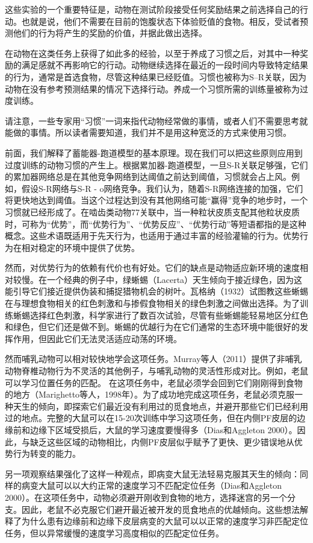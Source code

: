 这些实验的一个重要特征是，动物在测试阶段接受任何奖励结果之前选择自己的行动。也就是说，他们不需要在目前的饱腹状态下体验贬值的食物。相反，受试者预测他们的行为将产生的奖励的价值，并据此做出选择。\par
在动物在这类任务上获得了如此多的经验，以至于养成了习惯之后，对其中一种奖励的满足感就不再影响它的行动。动物继续选择在最近的一段时间内导致特定结果的行为，通常是首选食物，尽管这种结果已经贬值。习惯也被称为S–R关联，因为动物在没有参考预测结果的情况下选择行动。养成一个习惯所需的训练量被称为过度训练。\par
请注意，一些专家用“习惯”一词来指代动物经常做的事情，或者人们不需要思考就能做的事情。所以读者需要知道，我们并不是用这种宽泛的方式来使用习惯。\par
前面，我们解释了蓄能器-跑道模型的基本原理。现在我们可以把这些原则应用到过度训练的动物习惯的产生上。根据累加器-跑道模型，一旦S-R关联足够强，它们的累加器网络总是在其他竞争网络到达阈值之前达到阈值，习惯就会占上风。例如，假设S-R网络与S-R - o网络竞争。我们认为，随着S-R网络连接的加强，它们将更快地达到阈值。当这个过程达到没有其他网络可能“赢得”竞争的地步时，一个习惯就已经形成了。在啮齿类动物77关联中，当一种粒状皮质支配其他粒状皮质时，可称为“优势”，而“优势行为”、“优势反应”、“优势行动”等短语都指的是这种概念。这些术语既适用于先天行为，也适用于通过丰富的经验灌输的行为。优势行为在相对稳定的环境中提供了优势。\par
然而，对优势行为的依赖有代价也有好处。它们的缺点是动物适应新环境的速度相对较慢。在一个经典的例子中，绿蜥蜴（Lacerta）天生倾向于接近绿色，因为这能引导它们接近提供伪装和捕捉猎物机会的树叶。瓦格纳（1932）试图教这些蜥蜴在与理想食物相关的红色刺激和与掺假食物相关的绿色刺激之间做出选择。为了训练蜥蜴选择红色刺激，科学家进行了数百次试验，尽管有些蜥蜴能轻易地区分红色和绿色，但它们还是做不到。蜥蜴的优越行为在它们通常的生态环境中能很好的发挥作用，但因此它们无法灵活适应动荡的环境。\par
然而哺乳动物可以相对较快地学会这项任务。Murray等人（2011）提供了非哺乳动物脊椎动物行为不灵活的其他例子，与哺乳动物的灵活性形成对比。例如，老鼠可以学习位置任务的匹配。
在这项任务中，老鼠必须学会回到它们刚刚得到食物的地方（Marighetto等人，1998年）。为了成功地完成这项任务，老鼠必须克服一种天生的倾向，即探索它们最近没有利用过的觅食地点，并避开那些它们已经利用过的地点。完整的大鼠可以在15-20次训练中学习这项任务，但在内侧PF皮层的边缘前和边缘下区域受损后，大鼠的学习速度要慢得多（Dias和Aggleton 2000）。因此，与缺乏这些区域的动物相比，内侧PF皮层似乎赋予了更快、更少错误地从优势行为转变的能力。\par
另一项观察结果强化了这样一种观点，即病变大鼠无法轻易克服其天生的倾向：同样的病变大鼠可以以大约正常的速度学习不匹配定位任务（Dias和Aggleton 2000）。在这项任务中，动物必须避开刚收到食物的地方，选择迷宫的另一个分支。因此，老鼠不必克服它们避开最近被开发的觅食地点的优越倾向。这些想法解释了为什么患有边缘前和边缘下皮层病变的大鼠可以以正常的速度学习非匹配定位任务，但以异常缓慢的速度学习高度相似的匹配定位任务。\par
